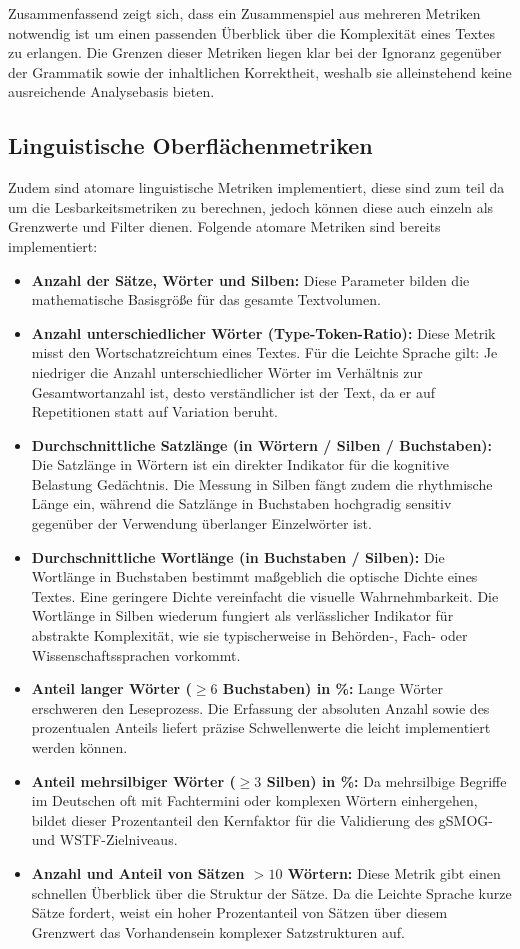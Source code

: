 Zusammenfassend zeigt sich, dass ein Zusammenspiel aus mehreren Metriken notwendig ist um einen passenden Überblick über die Komplexität eines Textes zu erlangen. Die Grenzen dieser Metriken liegen klar bei der Ignoranz gegenüber der Grammatik sowie der inhaltlichen Korrektheit, weshalb sie alleinstehend keine ausreichende Analysebasis bieten.

\subsection{Linguistische Oberflächenmetriken}
Zudem sind atomare linguistische Metriken implementiert, diese sind zum teil da um die Lesbarkeitsmetriken zu berechnen, jedoch können diese auch einzeln als Grenzwerte und Filter dienen.
Folgende atomare Metriken sind bereits implementiert:

\begin{itemize}
	\item \textbf{Anzahl der Sätze, Wörter und Silben:} Diese Parameter bilden die mathematische Basisgröße für das gesamte Textvolumen.
	\item \textbf{Anzahl unterschiedlicher Wörter (Type-Token-Ratio):} Diese Metrik misst den Wortschatzreichtum eines Textes. Für die Leichte Sprache gilt: Je niedriger die Anzahl unterschiedlicher Wörter im Verhältnis zur Gesamtwortanzahl ist, desto verständlicher ist der Text, da er auf Repetitionen statt auf Variation beruht.
	\item \textbf{Durchschnittliche Satzlänge (in Wörtern / Silben / Buchstaben):} Die Satzlänge in Wörtern ist ein direkter Indikator für die kognitive Belastung Gedächtnis. Die Messung in Silben fängt zudem die rhythmische Länge ein, während die Satzlänge in Buchstaben hochgradig sensitiv gegenüber der Verwendung überlanger Einzelwörter ist.
	\item \textbf{Durchschnittliche Wortlänge (in Buchstaben / Silben):} Die Wortlänge in Buchstaben bestimmt maßgeblich die optische Dichte eines Textes. Eine geringere Dichte vereinfacht die visuelle Wahrnehmbarkeit. Die Wortlänge in Silben wiederum fungiert als verlässlicher Indikator für abstrakte Komplexität, wie sie typischerweise in Behörden-, Fach- oder Wissenschaftssprachen vorkommt.
	\item \textbf{Anteil langer Wörter ($\ge 6$ Buchstaben) in \%:} Lange Wörter erschweren den Leseprozess. Die Erfassung der absoluten Anzahl sowie des prozentualen Anteils liefert präzise Schwellenwerte die leicht implementiert werden können.
	\item \textbf{Anteil mehrsilbiger Wörter ($\ge 3$ Silben) in \%:} Da mehrsilbige Begriffe im Deutschen oft mit Fachtermini oder komplexen Wörtern einhergehen, bildet dieser Prozentanteil den Kernfaktor für die Validierung des gSMOG- und WSTF-Zielniveaus.
	\item \textbf{Anzahl und Anteil von Sätzen $> 10$ Wörtern:} Diese Metrik gibt einen schnellen Überblick über die Struktur der Sätze. Da die Leichte Sprache kurze Sätze fordert, weist ein hoher Prozentanteil von Sätzen über diesem Grenzwert das Vorhandensein komplexer Satzstrukturen auf.
\end{itemize}

